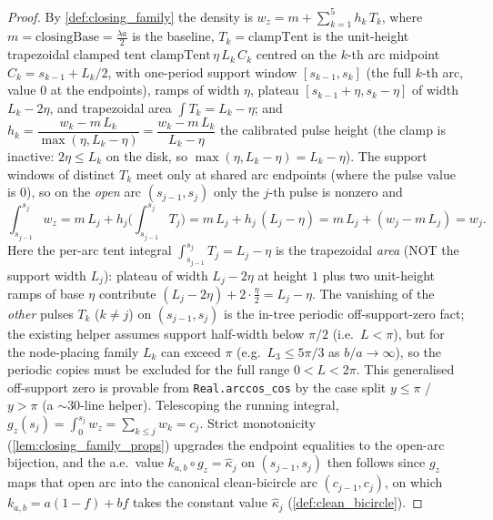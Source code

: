 \begin{proof}
  By \cref{def:closing_family} the density is $w_z=m+\sum_{k=1}^5 h_k\,T_k$, where
  $m=\mathrm{closingBase}=\tfrac{\lambda a}{2}$ is the baseline, $T_k=\mathrm{clampTent}$
  is the unit-height trapezoidal clamped tent $\mathrm{clampTent}\,\eta\,L_k\,C_k$
  centred on the $k$-th arc midpoint $C_k=s_{k-1}+L_k/2$, with one-period support
  window $[s_{k-1},s_k]$ (the full $k$-th arc, value $0$ at the endpoints), ramps
  of width $\eta$, plateau $[s_{k-1}+\eta,s_k-\eta]$ of width $L_k-2\eta$, and
  trapezoidal area $\int T_k=L_k-\eta$; and
  $h_k=\dfrac{w_k-m\,L_k}{\max(\eta,L_k-\eta)}=\dfrac{w_k-m\,L_k}{L_k-\eta}$ the
  calibrated pulse height (the clamp is inactive: $2\eta\le L_k$ on the disk, so
  $\max(\eta,L_k-\eta)=L_k-\eta$). The support windows of distinct $T_k$ meet only
  at shared arc endpoints (where the pulse value is $0$), so on the \emph{open} arc
  $(s_{j-1},s_j)$ only the $j$-th pulse is nonzero and
  \[
    \int_{s_{j-1}}^{s_j}w_z=m\,L_j+h_j\bigl(\textstyle\int_{s_{j-1}}^{s_j}T_j\bigr)
      =m\,L_j+h_j\,(L_j-\eta)=m\,L_j+(w_j-m\,L_j)=w_j .
  \]
  Here the per-arc tent integral $\int_{s_{j-1}}^{s_j}T_j=L_j-\eta$ is the
  trapezoidal \emph{area} (NOT the support width $L_j$): plateau of width
  $L_j-2\eta$ at height $1$ plus two unit-height ramps of base $\eta$ contribute
  $(L_j-2\eta)+2\cdot\tfrac{\eta}{2}=L_j-\eta$. The vanishing of the \emph{other}
  pulses $T_k$ ($k\neq j$) on $(s_{j-1},s_j)$ is the in-tree periodic
  off-support-zero fact; the existing helper assumes support half-width below
  $\pi/2$ (i.e.\ $L<\pi$), but for the node-placing family $L_k$ can exceed $\pi$
  (e.g.\ $L_3\le5\pi/3$ as $b/a\to\infty$), so the periodic copies must be excluded
  for the full range $0<L<2\pi$. This generalised off-support zero is provable from
  \texttt{Real.arccos\_cos} by the case split $y\le\pi$ / $y>\pi$ (a $\sim 30$-line
  helper). Telescoping the running integral,
  $g_z(s_j)=\int_0^{s_j}w_z=\sum_{k\le j}w_k=c_j$. Strict monotonicity
  (\cref{lem:closing_family_props}) upgrades the endpoint equalities to the
  open-arc bijection, and the a.e.\ value $k_{a,b}\circ g_z=\hat\kappa_j$ on
  $(s_{j-1},s_j)$ then follows since $g_z$ maps that open arc into the canonical
  clean-bicircle arc $(c_{j-1},c_j)$, on which $k_{a,b}=a(1-f)+bf$ takes the
  constant value $\hat\kappa_j$ (\cref{def:clean_bicircle}).
\end{proof}

